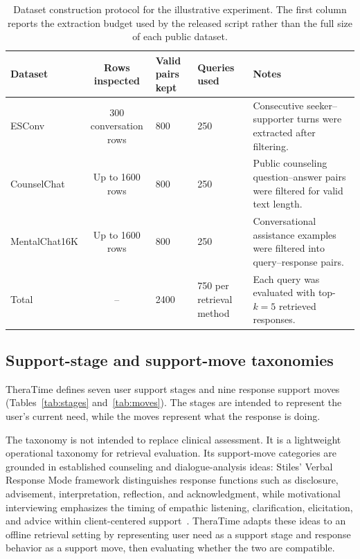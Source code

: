 \documentclass[preprint,12pt,a4paper]{elsarticle}
\begin{document}
\begin{table}[!htbp]
\centering
\caption{Dataset construction protocol for the illustrative experiment. The first column reports the extraction budget used by the released script rather than the full size of each public dataset.}
\label{tab:dataset_construction}
\small
\setlength{\tabcolsep}{5pt}
\renewcommand{\arraystretch}{1.15}
\begin{tabularx}{\linewidth}{lcm{1.5cm}m{1.5cm}X}
\toprule
\textbf{Dataset} & \textbf{Rows inspected} & \textbf{Valid pairs kept} & \textbf{Queries used} & \textbf{Notes} \\
\midrule
ESConv & 300 conversation rows & 800 & 250 & Consecutive seeker--supporter turns were extracted after filtering. \\
CounselChat & Up to 1600 rows & 800 & 250 & Public counseling question--answer pairs were filtered for valid text length. \\
MentalChat16K & Up to 1600 rows & 800 & 250 & Conversational assistance examples were filtered into query--response pairs. \\
\midrule
Total & -- & 2400 & 750 per retrieval method & Each query was evaluated with top-\(k=5\) retrieved responses. \\
\bottomrule
\end{tabularx}
\end{table}

\subsection{Support-stage and support-move taxonomies}

TheraTime defines seven user support stages and nine response support moves (Tables~\ref{tab:stages} and~\ref{tab:moves}). The stages are intended to represent the user's current need, while the moves represent what the response is doing.

The taxonomy is not intended to replace clinical assessment. It is a lightweight operational taxonomy for retrieval evaluation. Its support-move categories are grounded in established counseling and dialogue-analysis ideas: Stiles' Verbal Response Mode framework distinguishes response functions such as disclosure, advisement, interpretation, reflection, and acknowledgment, while motivational interviewing emphasizes the timing of empathic listening, clarification, elicitation, and advice within client-centered support~\cite{Stiles1992VRM,Miller2013MI}. TheraTime adapts these ideas to an offline retrieval setting by representing user need as a support stage and response behavior as a support move, then evaluating whether the two are compatible.
\end{document}
